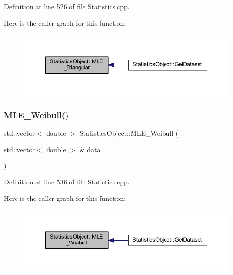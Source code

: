 Definition at line 526 of file Statistics.\+cpp.

Here is the caller graph for this function\+:\nopagebreak
\begin{figure}[H]
\begin{center}
\leavevmode
\includegraphics[width=350pt]{class_statistics_object_aecf3e116092cfcfd2a44e1a1936f7b9d_icgraph}
\end{center}
\end{figure}
\mbox{\label{class_statistics_object_ad4af7e6da209156c12ee1a5d2c9071bb}} 
\subsubsection{\texorpdfstring{M\+L\+E\+\_\+\+Weibull()}{MLE\_Weibull()}}
{\footnotesize\ttfamily std\+::vector$<$ double $>$ Statistics\+Object\+::\+M\+L\+E\+\_\+\+Weibull (\begin{DoxyParamCaption}\item[{std\+::vector$<$ double $>$ \&}]{data }\end{DoxyParamCaption})\hspace{0.3cm}{\ttfamily [protected]}}



Definition at line 536 of file Statistics.\+cpp.

Here is the caller graph for this function\+:\nopagebreak
\begin{figure}[H]
\begin{center}
\leavevmode
\includegraphics[width=350pt]{class_statistics_object_ad4af7e6da209156c12ee1a5d2c9071bb_icgraph}
\end{center}
\end{figure}
\mbox{\label{class_statistics_object_ade153b4af992cc1df2c515cde8e01ef9}} 
